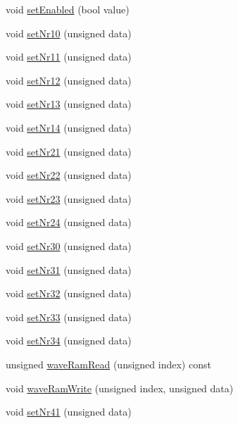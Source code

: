 \begin{DoxyCompactItemize}
\item 
void \hyperlink{classgambatte_1_1PSG_a4186a8804aef89c37b5c7bd0e226d911}{set\+Enabled} (bool value)
\item 
void \hyperlink{classgambatte_1_1PSG_a81254f4d126220d73fbba4e49faa001e}{set\+Nr10} (unsigned data)
\item 
void \hyperlink{classgambatte_1_1PSG_a808c7eeb314688f6bfcf99769cff4750}{set\+Nr11} (unsigned data)
\item 
void \hyperlink{classgambatte_1_1PSG_ac8ee32dcc76c89ed380fd54ea1221b93}{set\+Nr12} (unsigned data)
\item 
void \hyperlink{classgambatte_1_1PSG_a7efd38111196e78e40c5f67460a93ad5}{set\+Nr13} (unsigned data)
\item 
void \hyperlink{classgambatte_1_1PSG_a86567a2fb104433f3c05643bba9072df}{set\+Nr14} (unsigned data)
\item 
void \hyperlink{classgambatte_1_1PSG_ad2206176af15b5621bad104e2dc40e69}{set\+Nr21} (unsigned data)
\item 
void \hyperlink{classgambatte_1_1PSG_ab2656b6ba7d5712fafb53182528d2c57}{set\+Nr22} (unsigned data)
\item 
void \hyperlink{classgambatte_1_1PSG_a610f5d401404d2c601d0f4813477370f}{set\+Nr23} (unsigned data)
\item 
void \hyperlink{classgambatte_1_1PSG_a9eaf4998539c629de3fe0a875048fa4b}{set\+Nr24} (unsigned data)
\item 
void \hyperlink{classgambatte_1_1PSG_a395fa7c7e3518e087061721c840f054d}{set\+Nr30} (unsigned data)
\item 
void \hyperlink{classgambatte_1_1PSG_a99bc6b4fc72cf5398496dd84a097a1c9}{set\+Nr31} (unsigned data)
\item 
void \hyperlink{classgambatte_1_1PSG_a5392a2e38c4aaf3377c84951ef56eded}{set\+Nr32} (unsigned data)
\item 
void \hyperlink{classgambatte_1_1PSG_a70cbb966a63ab433dddb90b921a63475}{set\+Nr33} (unsigned data)
\item 
void \hyperlink{classgambatte_1_1PSG_af4004803643812c9e87ba17f3b74d969}{set\+Nr34} (unsigned data)
\item 
unsigned \hyperlink{classgambatte_1_1PSG_a8af8df33947c1c09383a337ae244c512}{wave\+Ram\+Read} (unsigned index) const
\item 
void \hyperlink{classgambatte_1_1PSG_aeee9a936876aaa74b7dd49d666b48f8a}{wave\+Ram\+Write} (unsigned index, unsigned data)
\item 
void \hyperlink{classgambatte_1_1PSG_a0a34900626d6f8bf2cf903695bb810d0}{set\+Nr41} (unsigned data)

\end{DoxyCompactItemize}
